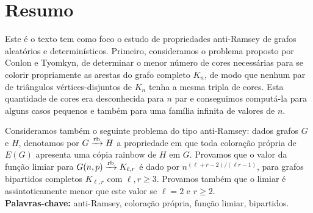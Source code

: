 \documentclass[12pt,a4paper]{book}
\newcommand{\K}{K_{\ell,r}} %
\def\rbarrow{\xrightarrow[]{\raisebox{0.0mm}[0mm]{$\scriptstyle \rm rb$}}}
\begin{document}



\chapter*{Resumo}

 Este é o texto tem como foco o estudo de propriedades anti-Ramsey de grafos aleatórios e determinísticos.
 Primeiro,
consideramos o problema proposto por Conlon e Tyomkyn, de determinar o menor número de cores necessárias para se colorir propriamente as arestas do grafo completo $K_n$,
de modo que nenhum par de triângulos vértices-disjuntos de $K_n$ tenha a mesma tripla de cores. 
Esta quantidade de cores era desconhecida para $n$ par e conseguimos computá-la para alguns casos pequenos e também para uma família infinita de valores de $n$.

Consideramos também o seguinte problema do tipo anti-Ramsey: dados grafos $G$ e $H$, denotamos por $G \rbarrow H$ a propriedade em que toda coloração própria de $E(G)$ apresenta uma cópia rainbow de $H$ em $G$.
Provamos que o valor da função limiar para $G(n,p) \rbarrow K_{\ell,r}$ é dado por $n^{(\ell+r-2)/(\ell r-1)}$, para grafos bipartidos completos $\K$ com $\ell,r \geq 3$. Provamos também que o limiar é assintoticamente menor que este valor se $\ell=2$ e $r\geq 2$.
\\

\noindent \textbf{Palavras-chave:} anti-Ramsey, coloração própria, função limiar, bipartidos.

\end{document}

